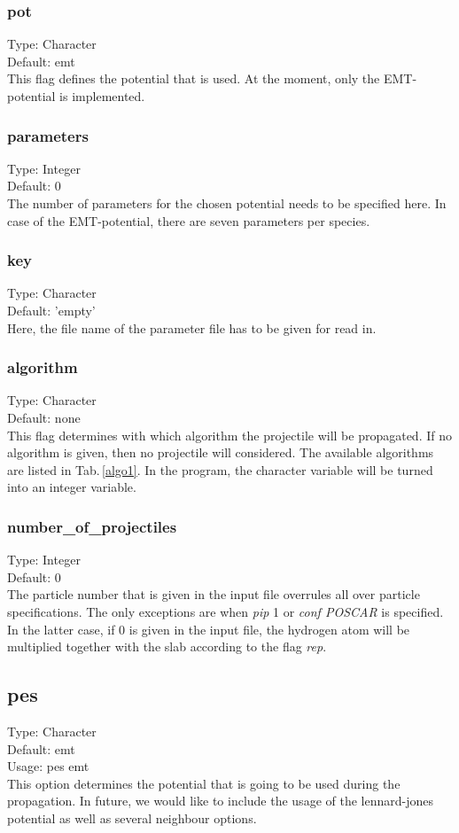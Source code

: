 \documentclass[twoside, 11pt, titlepage, captions=nooneline, a4paper, headsepline]{scrbook}%
\begin{document}
\subsubsection*{pot}
Type: Character\\
Default: emt\\
This flag defines the potential that is used. At the moment, only the EMT-potential is implemented.
\subsubsection*{parameters}
Type: Integer \\
Default: 0\\
The number of parameters for the chosen potential needs to be specified here. In case of the EMT-potential, there are seven parameters per species.
\subsubsection*{key}
Type: Character\\
Default: 'empty'\\
Here, the file name of the parameter file has to be given for read in.
\subsubsection*{algorithm}
Type: Character\\
Default: none\\
This flag determines with which algorithm the projectile will be propagated. If no algorithm is given, then no projectile will considered. The available algorithms are listed in Tab.\,\ref{algo1}.
In the program, the character variable will be turned into an integer variable.
\subsubsection*{number\_of\_projectiles}
Type: Integer\\
Default: 0\\
The particle number that is given in the input file overrules all over particle specifications. The only exceptions are when \emph{pip} 1 or \emph{conf POSCAR} is specified. In the latter case, if 0 is given in the input file, the hydrogen atom will be multiplied together with the slab according to the flag \textit{rep}.

\subsection*{pes}
Type: Character\\
Default: emt\\
Usage: pes emt\\
This option determines the potential that is going to be used during the propagation. In future, we would like to include the usage of the lennard-jones potential as well as several neighbour options.
\end{document}
